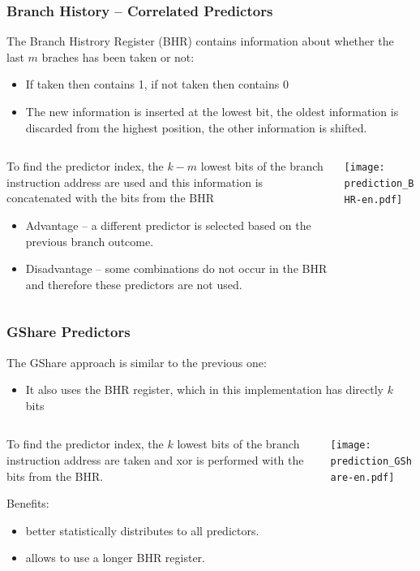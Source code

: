 \documentclass{beamer}
\begin{document}
\begin{frame}
\frametitle{Branch History -- Correlated Predictors}

The Branch Histrory Register (BHR) contains information about whether the last $m$ braches has been taken or not:
\begin{itemize}
\item If taken then contains 1, if not taken then contains 0
\item The new information is inserted at the lowest bit, the oldest information is discarded from the highest position, the other information is shifted.
\end{itemize}

\begin{columns}[T]
\begin{column}{0.5\textwidth}
\small
To find the predictor index, the $k-m$ lowest bits of the branch instruction address are used and this information is concatenated with the bits from the BHR
\begin{itemize}
\item Advantage -- a different predictor is selected based on the previous branch outcome.
\item Disadvantage -- some combinations do not occur in the BHR and therefore these predictors are not used.
\end{itemize}
\end{column}
\begin{column}{0.5\textwidth}
\texttt{[image: prediction\_BHR-en.pdf]}
\end{column}
\end{columns}

\end{frame}

\begin{frame}
\frametitle{GShare Predictors}

The GShare approach is similar to the previous one:
\begin{itemize}
\item It also uses the BHR register, which in this implementation has directly $k$ bits
\end{itemize}

\begin{columns}[T]
\begin{column}{0.5\textwidth}
\small
To find the predictor index, the $k$ lowest bits of the branch instruction address are taken and xor is performed with the bits from the BHR.

Benefits:
\begin{itemize}
\item better statistically distributes to all predictors.
\item allows to use a longer BHR register.
\end{itemize}
\end{column}
\begin{column}{0.5\textwidth}
\texttt{[image: prediction\_GShare-en.pdf]}
\end{column}
\end{columns}
\end{frame}
\end{document}
